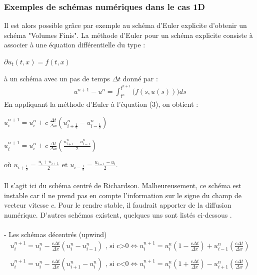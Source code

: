 \documentclass[12pt]{article}
\begin{document}
\subsubsection{Exemples de schémas numériques dans le cas 1D}

\noindent Il est alors possible grâce par exemple au schéma d'Euler explicite d'obtenir un schéma "Volumes Finis".
La méthode d'Euler pour un schéma explicite consiste à associer à une équation différentielle du type :
\begin{center}
        $\partial u_t(t,x)=f(t,x)$
\end{center}
à un schéma avec un pas de temps $\Delta t$ donné par :
\begin{eqnarray}
        u^{n+1}-u^{n} =  \int_{t^{n}}^{t^{n+1}}\big(f(s,u(s)))ds
\end{eqnarray}
\noindent En appliquant la méthode d'Euler à l'équation (3), on obtient :

\begin{center}
        $u^{n+1}_i=u_i^n + \displaystyle c \, \frac{\Delta t}{\Delta x}(u_{i+\frac{1}{2}}^n-u_{i-\frac{1}{2}}^n)$
        \leavevmode\\
        \leavevmode\\
        $u^{n+1}_i=u_i^n +  \displaystyle c \, \frac{\Delta t}{\Delta x}\left(\frac{u_{i+1}^n-u_{i-1}^n}{2}\right)$
\end{center}

\noindent où $u_{i+\frac{1}{2}} = \displaystyle\frac{u_i+u_{i+1}}{2}$ \: et \: $u_{i-\frac{1}{2}} = \displaystyle\frac{u_{i-1}-u_{i}}{2}$.
\\
\\
Il s'agit ici du schéma centré de Richardson. Malheureusement, ce schéma est instable car il ne prend pas en compte l'information sur le signe du champ de vecteur vitesse $c$. Pour le rendre stable, il faudrait apporter de la diffusion numérique.
D'autres schémas existent, quelques uns sont listés ci-dessous \cite{ref11}.
\\
\\- Les schémas décentrés (upwind)
\begin{eqnarray*}
        u^{n+1}_i=u_i^n-\frac{c\Delta t}{\Delta x}({u_{i}^n-u_{i-1}^n}) \text{       , si c>0}
        \iff u^{n+1}_i=u_i^n\left(1-\frac{c\Delta t}{\Delta x}\right)+u_{i-1}^n\left(\frac{c\Delta t}{\Delta x}\right)	
        \\
        \\
        u^{n+1}_i=u_i^n-\frac{c\Delta t}{\Delta x}({u_{i+1}^n-u_{i}^n}) \text{       , si c<0}
        \iff u^{n+1}_i=u_i^n\left(1+\frac{c\Delta t}{\Delta x}\right)-u_{i+1}^n\left(\frac{c\Delta t}{\Delta x}\right)
\end{eqnarray*}
\end{document}
